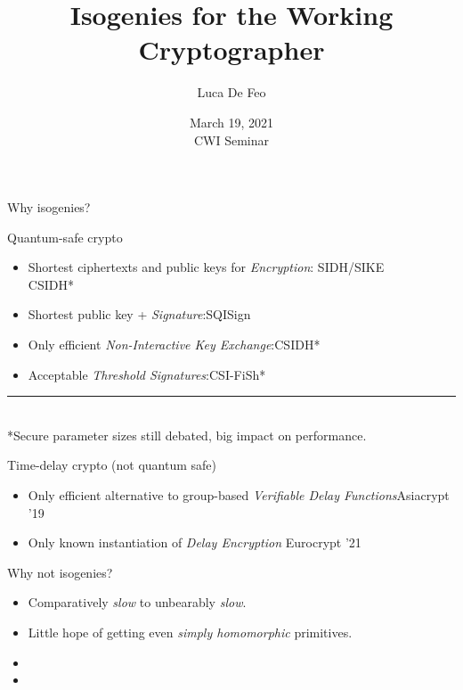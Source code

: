 \documentclass[aspectratio=169]{beamer}
\title{Isogenies for the Working Cryptographer}
\author{Luca De Feo}
\date[Mar 19, 2021, CWI 2021]{March 19, 2021\\
  CWI Seminar}
\institute{IBM Research Zürich}
\begin{document}
\frame[plain]{\titlepage}


\begin{frame}{Why isogenies?}
  
  \begin{block}{Quantum-safe crypto}
    \begin{itemize}
    \item Shortest ciphertexts and public keys for \emph{Encryption}:\hfill
      SIDH/SIKE\\
      \hfill CSIDH*
    \item Shortest public key + \emph{Signature}:\hfill SQISign
    \item Only efficient \emph{Non-Interactive Key Exchange}:\hfill CSIDH*
    \item Acceptable \emph{Threshold Signatures}:\hfill CSI-FiSh*
    \end{itemize}

    \medskip
    \rule{4em}{0.1px}\\
    \small
    *Secure parameter sizes still debated, big impact on performance.
  \end{block}
  
  \begin{block}{Time-delay crypto (not quantum safe)}
    \begin{itemize}
    \item Only efficient alternative to group-based \emph{Verifiable Delay
        Functions}\hfill Asiacrypt '19
    \item Only known instantiation of \emph{Delay Encryption}
      \hfill Eurocrypt '21
    \end{itemize}
  \end{block}
\end{frame}


\begin{frame}{Why not isogenies?}
  \large
  
  \begin{itemize}
    \setlength{\itemsep}{2em}
  \item Comparatively \emph{slow} to unbearably \emph{slow}.
  \item Little hope of getting even \emph{simply homomorphic} primitives.
  \item {}
  \item {}
  \end{itemize}
\end{frame}
\end{document}

